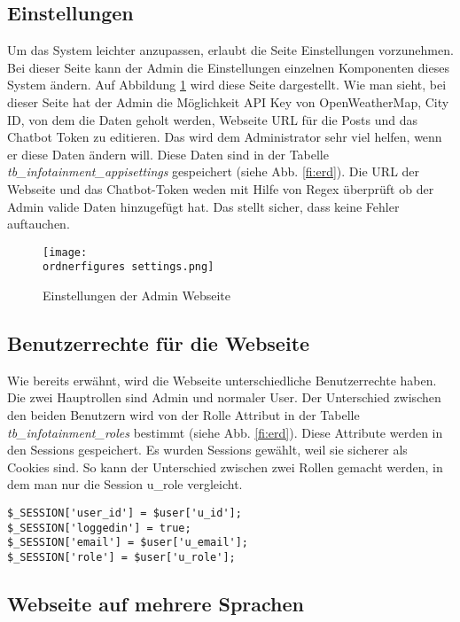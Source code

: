 \subsection{Einstellungen}
Um das System leichter anzupassen, erlaubt die Seite Einstellungen vorzunehmen. Bei dieser Seite kann der Admin die Einstellungen einzelnen Komponenten dieses System ändern. Auf Abbildung \ref{fi:settings} wird diese Seite dargestellt. Wie man sieht, bei dieser Seite hat der Admin die Möglichkeit API Key von OpenWeatherMap, City ID, von dem die Daten geholt werden, Webseite URL für die Posts und das Chatbot Token zu editieren. Das wird dem Administrator sehr viel helfen, wenn er diese Daten ändern will. Diese Daten sind in der Tabelle \textit{tb\_infotainment\_appisettings} gespeichert (siehe Abb. \ref{fi:erd}). Die URL der Webseite und das Chatbot-Token weden mit Hilfe von Regex überprüft ob der Admin valide Daten hinzugefügt hat. Das stellt sicher, dass keine Fehler auftauchen.

\begin{figure}[H]
	\centering
	\texttt{[image: \\ordnerfigures settings.png]}
	\caption{Einstellungen der Admin Webseite}
	\label{fi:settings}
\end{figure}


\subsection{Benutzerrechte für die Webseite}
Wie bereits erwähnt, wird die Webseite unterschiedliche Benutzerrechte haben. Die zwei Hauptrollen sind Admin und normaler User. Der Unterschied zwischen den beiden Benutzern wird von der Rolle Attribut in der Tabelle \textit{tb\_infotainment\_roles} bestimmt (siehe Abb. \ref{fi:erd}). Diese Attribute werden in den Sessions gespeichert. Es wurden Sessions gewählt, weil sie sicherer als Cookies sind. \cite{40_sessions_cookies} So kann der Unterschied zwischen zwei Rollen gemacht werden, in dem man nur die Session u\_role vergleicht.
\begin{lstlisting}[frame=single]
$_SESSION['user_id'] = $user['u_id'];
$_SESSION['loggedin'] = true;
$_SESSION['email'] = $user['u_email'];
$_SESSION['role'] = $user['u_role'];
\end{lstlisting}


\subsection{Webseite auf mehrere Sprachen}

